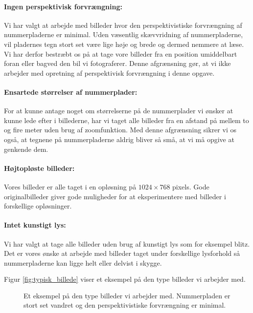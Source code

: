 \paragraph{Ingen perspektivisk forvrængning:}
Vi har valgt at arbejde med billeder hvor den perspektivistiske forvrængning af nummerpladerne er minimal. Uden væsentlig skævvridning af nummerpladerne, vil pladernes tegn stort set være lige høje og brede og dermed nemmere at læse. Vi har derfor bestræbt os på at tage vore billeder fra en position umiddelbart foran eller bagved den bil vi fotograferer. Denne afgrænsning gør, at vi ikke arbejder med opretning af perspektivisk forvrængning i denne opgave.

\paragraph{Ensartede størrelser af nummerplader:}
For at kunne antage noget om størrelserne på de nummerplader vi ønsker at kunne lede efter i billederne, har vi taget alle billeder fra en afstand på mellem to og fire meter uden brug af zoomfunktion. Med denne afgrænsning sikrer vi os også, at tegnene på nummerpladerne aldrig bliver så små, at vi må opgive at genkende dem.

\paragraph{Højtopløste billeder:}
Vores billeder er alle taget i en opløsning på $1024 \times 768$ pixels. Gode originalbilleder giver gode muligheder for at eksperimentere med billeder i forskellige opløsninger. 

\paragraph{Intet kunstigt lys:}
Vi har valgt at tage alle billeder uden brug af kunstigt lys som for eksempel blitz. Det er vores ønske at arbejde med billeder taget under forskellige lysforhold så nummerpladerne kan ligge helt eller delvist i skygge.  

Figur \vref{fig:typisk_billede} viser et eksempel på den type billeder vi arbejder med.

\begin{figure}[htp]
\centering
{} 
\caption{Et eksempel på den type billeder vi arbejder med. Nummerpladen er stort set vandret og den perspektivistiske forvrængning er minimal.}
\label{fig:typisk_billede}
\end{figure}

